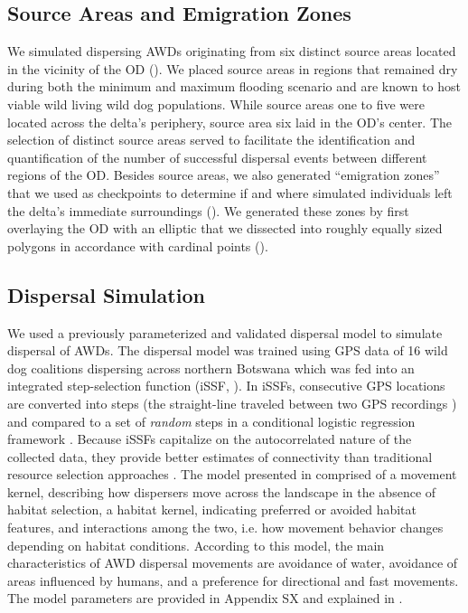 \documentclass[abstract=on,10pt,a4paper,bibliography=totocnumbered]{article}
\begin{document}
\subsection{Source Areas and Emigration Zones}
We simulated dispersing AWDs originating from six distinct source areas located
in the vicinity of the OD (). We placed source areas in regions
that remained dry during both the minimum and maximum flooding scenario and are
known to host viable wild living wild dog populations. While source areas one to
five were located across the delta's periphery, source area six laid in the OD's
center. The selection of distinct source areas served to facilitate the
identification and quantification of the number of successful dispersal events
between different regions of the OD. Besides source areas, we also generated
``emigration zones'' that we used as checkpoints to determine if and where
simulated individuals left the delta's immediate surroundings
(). We generated these zones by first overlaying the OD with an
elliptic that we dissected into roughly equally sized polygons in accordance
with cardinal points ().

\subsection{Dispersal Simulation}
We used a previously parameterized and validated dispersal model to simulate
dispersal of AWDs. The dispersal model was trained using GPS data of 16 wild dog
coalitions dispersing across northern Botswana \citep{Hofmann.2023} which was
fed into an integrated step-selection function (iSSF, \citealp{Avgar.2016}). In
iSSFs, consecutive GPS locations are converted into steps (the straight-line
traveled between two GPS recordings \citep{Turchin.1998a}) and compared to a set
of \textit{random} steps in a conditional logistic regression framework
\citep{Fortin.2005, Thurfjell.2014, Muff.2020, Fieberg.2021}. Because iSSFs
capitalize on the autocorrelated nature of the collected data, they provide
better estimates of connectivity than traditional resource selection approaches
\citep{Zeller.2016}. The model presented in \cite{Hofmann.2023} comprised of a
movement kernel, describing how dispersers move across the landscape in the
absence of habitat selection, a habitat kernel, indicating preferred or avoided
habitat features, and interactions among the two, i.e. how movement behavior
changes depending on habitat conditions. According to this model, the main
characteristics of AWD dispersal movements are avoidance of water, avoidance of
areas influenced by humans, and a preference for directional and fast movements.
The model parameters are provided in Appendix SX and explained in
\citealp{Hofmann.2023}.
\end{document}

